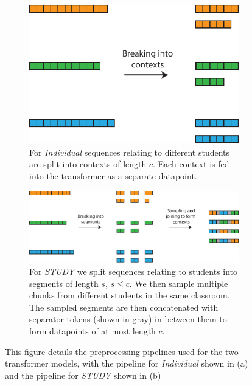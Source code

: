 \documentclass{article}
\begin{document}
\label{section:app:preprocessing}
\newcommand\proprocessingA{89.0}
\newcommand\proprocessingB{170.69}
\newcommand\proprocessingScale{0.006\linewidth}
\begin{figure}[h]
    \centering
    \begin{subfigure}[]{0.8\linewidth}
        \centering
        \includegraphics[width=0.534\linewidth]{figures/appendix/preprocessing_a.pdf}
        \caption{For \textit{Individual} sequences relating to different students are split into contexts of length $c$. Each context is fed into the transformer as a separate datapoint.}
    \end{subfigure}
    
    \vspace{3em}
    \begin{subfigure}[]{0.8\linewidth}
        \centering
        \includegraphics[width=\linewidth]{figures/appendix/preprocessing_b.pdf}
        \caption{For \textit{STUDY} we split sequences relating to students into segments of length $s$, $s \leq c$. We then sample multiple chunks from different students in the same classroom. The sampled segments are then concatenated with separator tokens (shown in gray) in between them to form datapoints of at most length $c$. }
    \end{subfigure}
    \vspace{2em}
    \caption{This figure details the preprocessing pipelines used for the two transformer models, with the pipeline for \textit{Individual} shown in (a) and the pipeline for \textit{STUDY} shown in (b)}
    \label{fig:preprocessing}
\end{figure}
\end{document}

